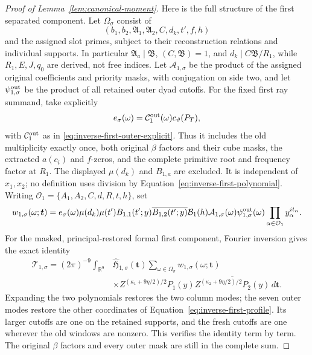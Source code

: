 \documentclass[12pt]{article}
\begin{document}
\begin{proof}[Proof of Lemma~\ref{lem:canonical-moment}]
Here is the full structure of the first separated component.  Let
\(\Omega_\sigma\) consist of
\[
 (b_1,b_2,\mathfrak A_1,\mathfrak A_2,C,d_k,t',f,h)
\]
and the assigned slot primes, subject to their reconstruction relations and individual
supports.  In particular
\(\mathfrak A_a\mid\mathfrak B\), \((C,\mathfrak B)=1\), and
\(d_k\mid C\mathfrak B/R_1\), while \(R_1,E,J,q_0\) are derived,
not free indices.
Let \(\mathcal A_{1,\sigma}\) be the product of the assigned original
coefficients and priority masks, with conjugation on side two, and let
\(\psi_{1,\sigma}^{\rm out}\) be the product of all retained outer
dyad cutoffs.  For the fixed first ray summand, take explicitly
\[
 e_\sigma(\omega)=
      \mathcal C^{\rm out}_1(\omega)c_\vartheta(P_T),
\]
with \(\mathcal C^{\rm out}_1\) as in
\eqref{eq:inverse-first-outer-explicit}.
Thus it includes the old multiplicity exactly once, both original
\(\beta\) factors and their cube masks, the extracted \(a(c_i)\)
and \(f\)-zeros, and the complete primitive root and frequency factor
at \(R_1\).  The displayed \(\mu(d_k)\) and \(B_{1,a}\) are
excluded.  It is independent of \(x_1,x_2\); no definition uses
division by Equation~\eqref{eq:inverse-first-polynomial}.
Writing \(\mathcal O_1=\{A_1,A_2,C,d,R,t,h\}\), set
\[
 w_{1,\sigma}(\omega;\boldsymbol t)
 =e_\sigma(\omega)\mu(d_k)\mu(t')B_{1,1}(t';y)
       \overline{B_{1,2}(t';y)}\mathcal B_1(h)
       \mathcal A_{1,\sigma}(\omega)\psi_{1,\sigma}^{\rm out}(\omega)
       \prod_{\alpha\in\mathcal O_1}y_\alpha^{it_\alpha}.
\]
For the masked, principal-restored formal first component, Fourier
inversion gives the exact identity
\begin{equation}\label{eq:inverse-first-separated}
 \begin{split}
 \mathcal T_{1,\sigma}=(2\pi)^{-9}\int_{\mathbb R^9}
 &\widehat{\mathfrak H}_{1,\sigma}(\boldsymbol t)
 \sum_{\omega\in\Omega_\sigma}w_{1,\sigma}(\omega;\boldsymbol t)\\
 &\times Z^{(\kappa_1+9\eta/2)/2}P_1(y)
       \overline{Z^{(\kappa_2+9\eta/2)/2}P_2(y)}\,d\boldsymbol t.
 \end{split}
\end{equation}
Expanding the two polynomials restores the two column modes; the seven
outer modes restore the other coordinates of
Equation~\eqref{eq:inverse-first-profile}.  Its larger cutoffs are one
on the retained supports, and the fresh cutoffs are one wherever the
old windows are nonzero.  This verifies the identity term by term.
The original \(\beta\) factors and every outer mask are still in the
complete sum.


\end{proof}
\end{document}
